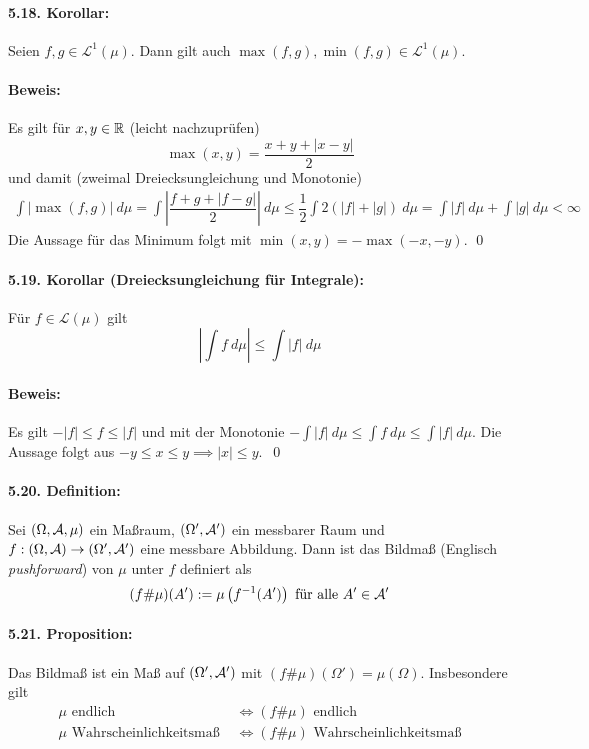 \documentclass[12pt]{report}
\begin{document}
 \paragraph{5.18. Korollar:}Seien $f,g\in\mathcal{L}^1(\mu)$. Dann gilt auch $\max(f,g),\min(f,g)\in\mathcal{L}^1(\mu)$.
 
 
 \paragraph{Beweis:}Es gilt f\"ur $x,y\in\mathbb{R}$ (leicht nachzupr\"ufen)
 $$\max(x,y)=\dfrac{x+y+|x-y|}{2}$$
 und damit (zweimal Dreiecksungleichung und Monotonie)
 \begin{align*}
     \int |\max(f,g)|\ d\mu=\int \left|\dfrac{f+g+|f-g|}{2}\right|\ d\mu
     \leq\dfrac{1}{2}\int2(|f|+|g|)\ d\mu=\int |f|\ d\mu+\int |g|\ d\mu<\infty 
 \end{align*}
 Die Aussage f\"ur das Minimum folgt mit $\min(x,y)=-\max(-x,-y)$. \qed
 
 \paragraph{5.19. Korollar (Dreiecksungleichung f\"ur Integrale):}F\"ur $f\in\mathcal{L}(\mu)$ gilt
 $$\left|\int f\ d\mu\right|\leq\int |f|\ d\mu$$
 
 \paragraph{Beweis:}Es gilt $-|f|\leq f\leq |f|$ und mit der Monotonie $\displaystyle-\int |f|\ d\mu\leq\int f\ d\mu\leq \int |f|\ d\mu$. Die Aussage folgt aus $-y\leq x\leq y\implies |x|\leq y$. \qed
 
 
\paragraph{5.20. Definition:}Sei $(\Omega,\mathcal{A},\mu)$ ein Ma\ss{}raum, $(\Omega',\mathcal{A}')$ ein messbarer Raum und $f:(\Omega,\mathcal{A})\to\nobreak(\Omega',\mathcal{A}')$ eine messbare Abbildung. Dann ist das Bildma\ss{} (Englisch \textit{pushforward}) von $\mu$ unter $f$ definiert als
$$(f\#\mu)(A'):=\mu\left(f^{-1}(A')\right)\text{ f\"ur alle }A'\in\mathcal{A}'$$
 
 \paragraph{5.21. Proposition:}Das Bildma\ss{} ist ein Ma\ss{} auf $(\Omega',\mathcal{A}')$ mit $(f\#\mu)(\Omega')=\mu(\Omega)$. Insbesondere gilt
 \begin{align*}
     \mu\text{ endlich }&\iff(f\#\mu)\text{ endlich}\\
     \mu\text{ Wahrscheinlichkeitsma\ss{} }&\iff(f\#\mu)\text{ Wahrscheinlichkeitsma\ss{}}\\
 \end{align*}
 
\end{document}
